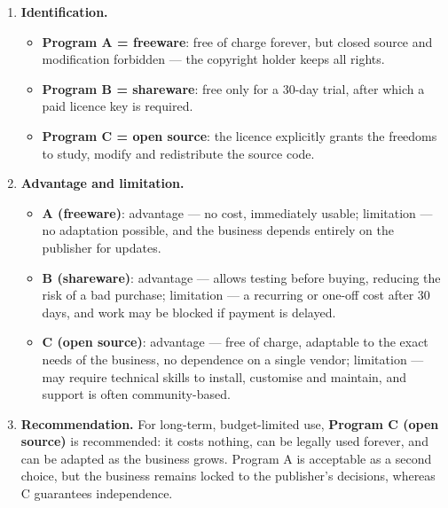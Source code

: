 \documentclass[11pt]{article}
\begin{document}
\begin{corrige}
\begin{enumerate}
\item \textbf{Identification.}
\begin{itemize}
\item \textbf{Program A = freeware}: free of charge forever, but closed source and modification forbidden — the copyright holder keeps all rights.
\item \textbf{Program B = shareware}: free only for a 30-day trial, after which a paid licence key is required.
\item \textbf{Program C = open source}: the licence explicitly grants the freedoms to study, modify and redistribute the source code.
\end{itemize}
\item \textbf{Advantage and limitation.}
\begin{itemize}
\item \textbf{A (freeware)}: advantage — no cost, immediately usable; limitation — no adaptation possible, and the business depends entirely on the publisher for updates.
\item \textbf{B (shareware)}: advantage — allows testing before buying, reducing the risk of a bad purchase; limitation — a recurring or one-off cost after 30 days, and work may be blocked if payment is delayed.
\item \textbf{C (open source)}: advantage — free of charge, adaptable to the exact needs of the business, no dependence on a single vendor; limitation — may require technical skills to install, customise and maintain, and support is often community-based.
\end{itemize}
\item \textbf{Recommendation.} For long-term, budget-limited use, \textbf{Program C (open source)} is recommended: it costs nothing, can be legally used forever, and can be adapted as the business grows. Program A is acceptable as a second choice, but the business remains locked to the publisher's decisions, whereas C guarantees independence.
\end{enumerate}
\end{corrige}
\end{document}
